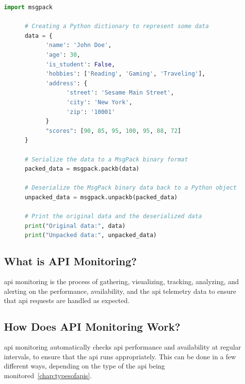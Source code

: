 \begin{multicols}{2}
\begin{lstlisting}[language=Python, caption=MsgPack Serialization and Deserialization in Python]
      import msgpack

      # Creating a Python dictionary to represent some data
      data = {
            'name': 'John Doe',
            'age': 30,
            'is_student': False,
            'hobbies': ['Reading', 'Gaming', 'Traveling'],
            'address': {
                  'street': 'Sesame Main Street',
                  'city': 'New York',
                  'zip': '10001'
            }
            "scores": [90, 85, 95, 100, 95, 88, 72]
      }

      # Serialize the data to a MsgPack binary format
      packed_data = msgpack.packb(data)

      # Deserialize the MsgPack binary data back to a Python object
      unpacked_data = msgpack.unpackb(packed_data)

      # Print the original data and the deserialized data
      print("Original data:", data)
      print("Unpacked data:", unpacked_data)
\end{lstlisting}


\subsection{What is API Monitoring?}
\acrshort{api} monitoring is the process of gathering, visualizing, tracking, analyzing, and alerting on the
performance, availability, and the \acrshort{api} telemetry data to ensure that \acrshort{api} requests are
handled as expected.
\subsection{How Does API Monitoring Work?}
\acrshort{api} monitoring automatically checks \acrshort{api} performance and availability at regular intervals,
to ensure that the \acrshort{api} runs appropriately. This can be done in a few different ways, depending on the
type of the \acrshort{api} being monitored~\ref{chap:typesofapis}.


\end{multicols}

